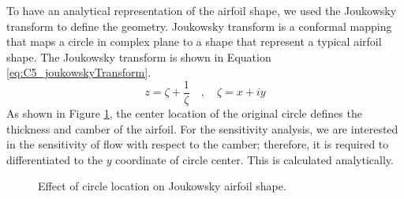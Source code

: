 To have an analytical representation of the airfoil shape, we used the Joukowsky transform to define the geometry. Joukowsky transform is a conformal mapping that maps a circle in complex plane to a shape that represent a typical airfoil shape. The Joukowsky transform is shown in Equation \eqref{eq:C5_joukowskyTransform}.
%
\begin{equation}\label{eq:C5_joukowskyTransform}
	z = \zeta + \frac{1}{\zeta} \quad , \quad \zeta = x + iy
\end{equation}
%
As shown in Figure \ref{fig:C5_joukowskyAirfoil}, the center location of the original circle defines the thickness and camber of the airfoil. For the sensitivity analysis, we are interested in the sensitivity of flow with respect to the camber; therefore, it is required to differentiated to the $y$ coordinate of circle center. This is calculated analytically.
%
\begin{figure}[H]
    \centering
    \quad
    \quad
    \caption{Effect of circle location on Joukowsky airfoil shape.}
    \label{fig:C5_joukowskyAirfoil}
\end{figure}
%
